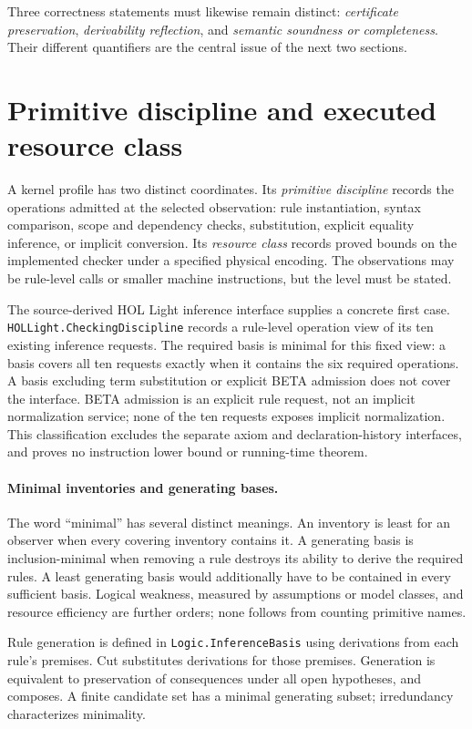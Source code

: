 \documentclass[11pt]{article}
\newcommand{\code}[1]{\nolinkurl{#1}}
\begin{document}
Three correctness statements must likewise remain distinct:
\emph{certificate preservation}, \emph{derivability reflection}, and
\emph{semantic soundness or completeness}. Their different quantifiers are
the central issue of the next two sections.

\section{Primitive discipline and executed resource class}
A kernel profile has two distinct coordinates. Its \emph{primitive discipline}
records the operations admitted at the selected observation: rule
instantiation, syntax comparison, scope and dependency checks, substitution,
explicit equality inference, or implicit conversion. Its \emph{resource class}
records proved bounds on the implemented checker under a specified physical
encoding. The observations may be rule-level calls or smaller machine
instructions, but the level must be stated.

The source-derived HOL Light inference interface supplies a concrete first
case. \code{HOLLight.CheckingDiscipline} records a rule-level operation view
of its ten existing inference requests. The required basis is minimal for
this fixed view: a basis covers all ten requests exactly when it contains
the six required operations. A basis excluding term substitution or explicit
BETA admission does not cover the interface. BETA admission is an explicit
rule request, not an implicit normalization service; none of the ten
requests exposes implicit normalization. This classification excludes the
separate axiom and declaration-history interfaces, and proves no instruction
lower bound or running-time theorem.

\paragraph{Minimal inventories and generating bases.}
The word ``minimal'' has several distinct meanings. An inventory is least
for an observer when every covering inventory contains it. A generating
basis is inclusion-minimal when removing a rule destroys its ability to
derive the required rules. A least generating basis would additionally have
to be contained in every sufficient basis. Logical weakness, measured by
assumptions or model classes, and resource efficiency are further orders;
none follows from counting primitive names.

Rule generation is defined in \code{Logic.InferenceBasis} using derivations
from each rule's premises. Cut substitutes derivations for those premises.
Generation is equivalent to preservation of consequences under all open
hypotheses, and composes. A finite candidate set has a minimal generating
subset; irredundancy characterizes minimality.
\end{document}
